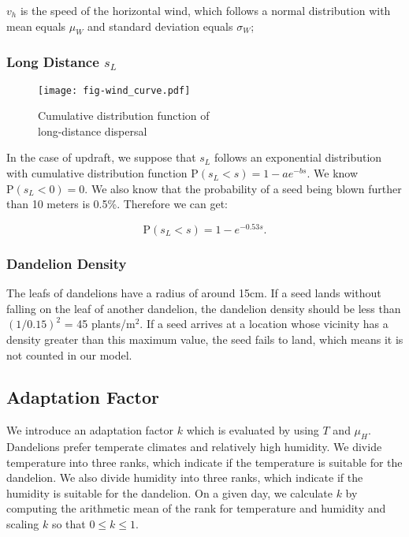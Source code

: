 \documentclass[12pt]{article}
\begin{document}
		$v_h$ is the speed of the horizontal wind, which follows a normal distribution with mean equals $\mu_W$ and standard deviation equals $\sigma_W$;

		\subsubsection{Long Distance $s_L$}
	
		\begin{wrapfigure}{r}{0.5\textwidth}
			\vspace{-1.5cm}
			\centering
			\texttt{[image: fig-wind\_curve.pdf]}
			\caption{Cumulative distribution function of\\long-distance dispersal}
			\label{fig:longDistance}
		\end{wrapfigure}
		
		In the case of updraft, we suppose that $s_L$ follows an exponential distribution\autocite{okubo1989theoretical} with cumulative distribution function $\mathrm{P} (s_L < s) = 1 - ae^{-bs}$.  We know $\mathrm{P} (s_L < 0) = 0$.  We also know that the probability of a seed being blown further than 10 meters is 0.5\%\autocite{tackenberg2003dandelion}.  Therefore we can get:
		
		\begin{equation}\label{eq:updraft}
			\mathrm{P} (s_L < s) = 1 - e^{-0.53 s}.
		\end{equation}
		
		\newpage
		\subsubsection{Dandelion Density}
		
		The leafs of dandelions have a radius of around 15cm.  If a seed lands without falling on the leaf of another dandelion, the dandelion density should be less than $(1/0.15)^2$ = 45 plants/m$^2$.  If a seed arrives at a location whose vicinity has a density greater than this maximum value, the seed fails to land, which means it is not counted in our model.
		
		
		
		
		
	\subsection{Adaptation Factor}
	\label{sec:af}
		
			We introduce an adaptation factor $k$ which is evaluated by using $T$ and $\mu_H$.  Dandelions prefer temperate climates and relatively high humidity.  We divide temperature into three ranks, which indicate if the temperature is suitable for the dandelion.  We also divide humidity into three ranks, which indicate if the humidity is suitable for the dandelion.  On a given day, we calculate $k$ by computing the arithmetic mean of the rank for temperature and humidity and scaling $k$ so that $0 \leq k \leq 1$.
			
\end{document}
